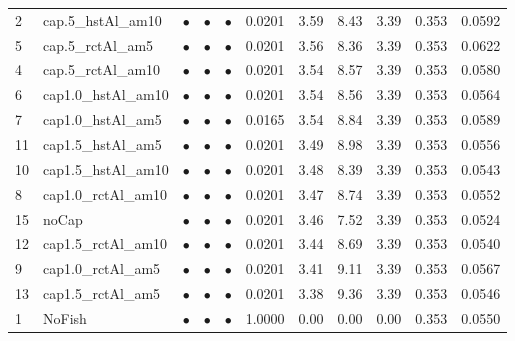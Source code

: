 \documentclass[11pt]{book}
\begin{document}
\begin{landscape}
\begin{longtable}[t]{llccccccccc}
2 & cap.5\_hstAl\_am10 & $\bullet$ & $\bullet$ & $\bullet$ & 0.0201 & 3.59 & 8.43 & 3.39 & 0.353 & 0.0592\\
5 & cap.5\_rctAl\_am5 & $\bullet$ & $\bullet$ & $\bullet$ & 0.0201 & 3.56 & 8.36 & 3.39 & 0.353 & 0.0622\\
4 & cap.5\_rctAl\_am10 & $\bullet$ & $\bullet$ & $\bullet$ & 0.0201 & 3.54 & 8.57 & 3.39 & 0.353 & 0.0580\\
6 & cap1.0\_hstAl\_am10 & $\bullet$ & $\bullet$ & $\bullet$ & 0.0201 & 3.54 & 8.56 & 3.39 & 0.353 & 0.0564\\
7 & cap1.0\_hstAl\_am5 & $\bullet$ & $\bullet$ & $\bullet$ & 0.0165 & 3.54 & 8.84 & 3.39 & 0.353 & 0.0589\\
11 & cap1.5\_hstAl\_am5 & $\bullet$ & $\bullet$ & $\bullet$ & 0.0201 & 3.49 & 8.98 & 3.39 & 0.353 & 0.0556\\
10 & cap1.5\_hstAl\_am10 & $\bullet$ & $\bullet$ & $\bullet$ & 0.0201 & 3.48 & 8.39 & 3.39 & 0.353 & 0.0543\\
8 & cap1.0\_rctAl\_am10 & $\bullet$ & $\bullet$ & $\bullet$ & 0.0201 & 3.47 & 8.74 & 3.39 & 0.353 & 0.0552\\
15 & noCap & $\bullet$ & $\bullet$ & $\bullet$ & 0.0201 & 3.46 & 7.52 & 3.39 & 0.353 & 0.0524\\
12 & cap1.5\_rctAl\_am10 & $\bullet$ & $\bullet$ & $\bullet$ & 0.0201 & 3.44 & 8.69 & 3.39 & 0.353 & 0.0540\\
9 & cap1.0\_rctAl\_am5 & $\bullet$ & $\bullet$ & $\bullet$ & 0.0201 & 3.41 & 9.11 & 3.39 & 0.353 & 0.0567\\
13 & cap1.5\_rctAl\_am5 & $\bullet$ & $\bullet$ & $\bullet$ & 0.0201 & 3.38 & 9.36 & 3.39 & 0.353 & 0.0546\\
1 & NoFish & $\bullet$ & $\bullet$ & $\bullet$ & 1.0000 & 0.00 & 0.00 & 0.00 & 0.353 & 0.0550\\*
\end{longtable}
\end{landscape}
\endgroup{}
\end{document}
